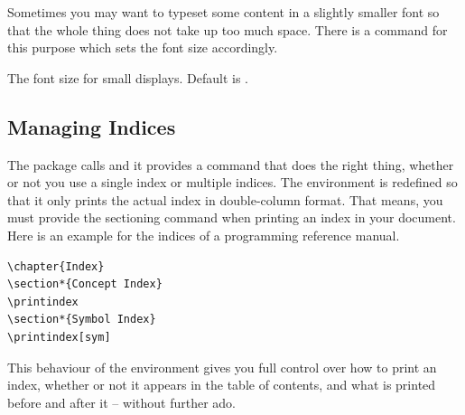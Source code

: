 \documentclass{scrartcl}
\begin{document}
Sometimes you may want to typeset some content in a slightly smaller
font so that the whole thing does not take up too much space.  There
is a command for this purpose which sets the font size accordingly.

\begin{definition}
The font size for small displays.
Default is \symb{\footnotesize}.
\end{definition}


\subsection{Managing Indices}

The  package calls \symb{\makeindex} and it provides
a \symb{\printindex} command that does the right thing, whether or not
you use a single index or multiple indices.  The 
environment is redefined so that it only prints the actual index in
double-column format.  That means, you must provide the sectioning
command when printing an index in your document.  Here is an example
for the indices of a programming reference manual.
\begin{display}
\begin{verbatim}
\chapter{Index}
\section*{Concept Index}
\printindex
\section*{Symbol Index}
\printindex[sym]
\end{verbatim}
\end{display}
This behaviour of the  environment gives you full
control over how to print an index, whether or not it appears in the
table of contents, and what is printed before and after it -- without
further ado.
\end{document}
